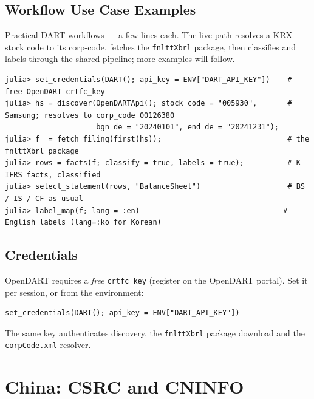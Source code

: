 \documentclass[11pt,a4paper]{report}
\begin{document}
\section{Workflow Use Case Examples}\label{sec:dart-workflows}

Practical DART workflows --- a few lines each. The live path resolves a KRX stock code to its corp-code,
fetches the \texttt{fnlttXbrl} package, then classifies and labels through the shared pipeline; more
examples will follow.

\begin{lstlisting}
julia> set_credentials(DART(); api_key = ENV["DART_API_KEY"])    # free OpenDART crtfc_key
julia> hs = discover(OpenDARTApi(); stock_code = "005930",       # Samsung; resolves to corp_code 00126380
                     bgn_de = "20240101", end_de = "20241231");
julia> f  = fetch_filing(first(hs));                             # the fnlttXbrl package
julia> rows = facts(f; classify = true, labels = true);          # K-IFRS facts, classified
julia> select_statement(rows, "BalanceSheet")                    # BS / IS / CF as usual
julia> label_map(f; lang = :en)                                 # English labels (lang=:ko for Korean)
\end{lstlisting}

\begin{subappendices}
\section{Credentials}\label{sec:dart-credentials}

OpenDART requires a \emph{free} \texttt{crtfc\_key} (register on the OpenDART portal). Set it per session, or
from the environment:

\begin{lstlisting}
set_credentials(DART(); api_key = ENV["DART_API_KEY"])
\end{lstlisting}

\noindent The same key authenticates discovery, the \texttt{fnlttXbrl} package download and the
\texttt{corpCode.xml} resolver.
\end{subappendices}

\chapter{China: CSRC and CNINFO}
\label{sys:china}
\end{document}
